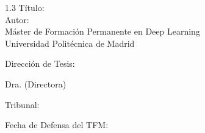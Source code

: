 
\begin{spacing}{1.3}
	Título: \thesisTitle \\
	Autor: \thesisAuthor\\
	Máster de Formación Permanente en Deep Learning\\
	Universidad Politécnica de Madrid\end{spacing}
Dirección de Tesis: 
\begin{mydescription}
	\item Dra. \supervisorDetails  (Directora)
	\item \cosupervisorDetails
\end{mydescription}

\vspace{10 mm}


\vspace{30 mm}

Tribunal: 


\vspace{50mm}



Fecha de Defensa del TFM: 



\vspace{\fill}

